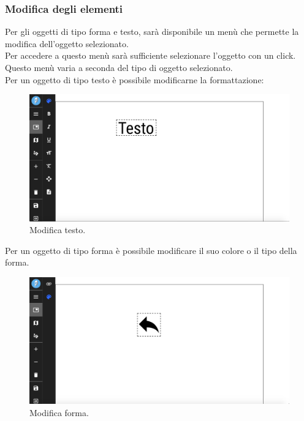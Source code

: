 \subsubsection{Modifica degli elementi}
Per gli oggetti di tipo forma e testo, sarà disponibile un menù che permette la modifica dell'oggetto selezionato.\\
Per accedere a questo menù sarà sufficiente selezionare l'oggetto con un click.\\
Questo menù varia a seconda del tipo di oggetto selezionato.\\
Per un oggetto di tipo testo è possibile modificarne la formattazione:
\begin{figure}[!h]
\begin{center}
\includegraphics[scale=0.35]{img/edit_text.png}
\caption{Modifica testo.}
\end{center}
\end{figure}
\newpage
Per un oggetto di tipo forma è possibile modificare il suo colore o il tipo della forma.\\
\begin{figure}[!h]
\begin{center}
\includegraphics[scale=0.35]{img/edit_shape.png}
\caption{Modifica forma.}
\end{center}
\end{figure}

